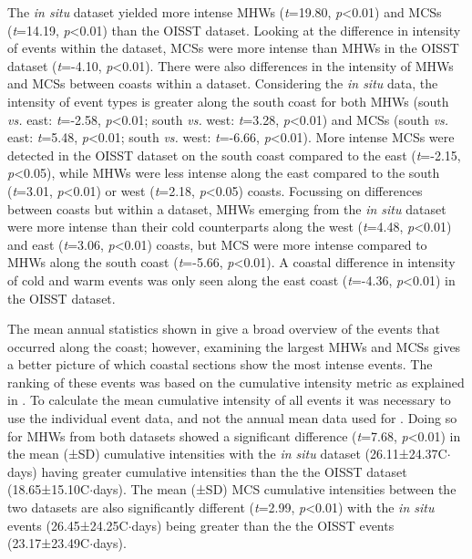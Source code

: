 \documentclass[a4paper,10pt,review]{elsarticle}
\begin{document}
The \emph{in situ} dataset yielded more intense MHWs (\emph{t}=19.80, \emph{p}<0.01) and MCSs (\emph{t}=14.19, \emph{p}<0.01) than the OISST dataset. Looking at the difference in intensity of events within the dataset, MCSs were more intense than MHWs in the OISST dataset (\emph{t}=-4.10, \emph{p}<0.01). There were also differences in the intensity of MHWs and MCSs between coasts within a dataset. Considering the \emph{in situ} data, the intensity of event types is greater along the south coast for both MHWs (south \emph{vs.} east: \emph{t}=-2.58, \emph{p}<0.01; south \emph{vs.} west: \emph{t}=3.28, \emph{p}<0.01) and MCSs (south \emph{vs.} east: \emph{t}=5.48, \emph{p}<0.01; south \emph{vs.} west: \emph{t}=-6.66, \emph{p}<0.01). More intense MCSs were detected in the OISST dataset on the south coast compared to the east (\emph{t}=-2.15, \emph{p}<0.05), while MHWs were less intense along the east compared to the south (\emph{t}=3.01, \emph{p}<0.01) or west (\emph{t}=2.18, \emph{p}<0.05) coasts. Focussing on differences between coasts but within a dataset, MHWs emerging from the \emph{in situ} dataset were more intense than their cold counterparts along the west (\emph{t}=4.48, \emph{p}<0.01) and east (\emph{t}=3.06, \emph{p}<0.01) coasts, but MCS were more intense compared to MHWs along the south coast (\emph{t}=-5.66, \emph{p}<0.01). A coastal difference in intensity of cold and warm events was only seen along the east coast (\emph{t}=-4.36, \emph{p}<0.01) in the OISST dataset.

The mean annual statistics shown in  give a broad overview of the events that occurred along the coast; however, examining the largest MHWs and MCSs gives a better picture of which coastal sections show the most intense events. The ranking of these events was based on the cumulative intensity metric as explained in . To calculate the mean cumulative intensity of all events it was necessary to use the individual event data, and not the annual mean data used for . Doing so for MHWs from both datasets showed a significant difference (\emph{t}=7.68, \emph{p}<0.01) in the mean (±SD) cumulative intensities with the \emph{in situ} dataset (26.11±24.37\degree C$\cdot$days) having greater cumulative intensities than the the OISST dataset (18.65±15.10\degree C$\cdot$days). The mean (±SD) MCS cumulative intensities between the two datasets are also significantly different (\emph{t}=2.99, \emph{p}<0.01) with the \emph{in situ} events (26.45±24.25\degree C$\cdot$days) being greater than the the OISST events (23.17±23.49\degree C$\cdot$days).
\end{document}
